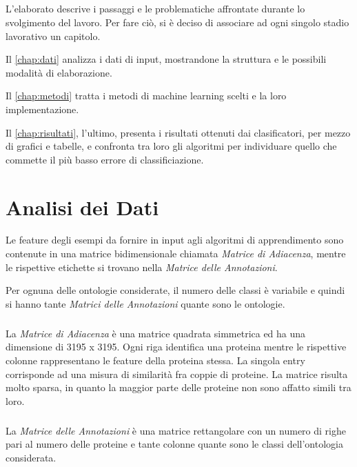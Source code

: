 \documentclass[12pt,a4paper,oneside,hidelinks]{report}
\begin{document}
\paragraph*{}
L'elaborato descrive i passaggi e le problematiche affrontate durante lo svolgimento del lavoro. Per fare ciò, si è deciso di associare ad ogni singolo stadio lavorativo un capitolo. 

Il \autoref{chap:dati} analizza i dati di input, mostrandone la struttura e le possibili modalità di elaborazione.

Il \autoref{chap:metodi} tratta i metodi di machine learning scelti e la loro implementazione. 

Il \autoref{chap:risultati}, l'ultimo, presenta i risultati ottenuti dai clasificatori, per mezzo di grafici e tabelle, e confronta tra loro gli algoritmi per individuare quello che commette il più basso errore di classificiazione.

\chapter{Analisi dei Dati} 
\label{chap:dati}
Le feature degli esempi da fornire in input agli algoritmi di apprendimento sono contenute in una matrice bidimensionale chiamata \textit{Matrice di Adiacenza}, mentre le rispettive etichette si trovano nella \textit{Matrice delle Annotazioni}.

Per ognuna delle ontologie considerate, il numero delle classi è variabile e quindi si hanno tante \textit{Matrici delle Annotazioni} quante sono le ontologie.

\paragraph*{}
La \textit{Matrice di Adiacenza} è una matrice quadrata simmetrica ed ha una dimensione di 3195 x 3195. Ogni riga identifica una proteina mentre le rispettive colonne rappresentano le feature della proteina stessa. La singola entry corrisponde ad una misura di similarità fra coppie di proteine. La matrice risulta molto sparsa, in quanto la maggior parte delle proteine non sono affatto simili tra loro.

\paragraph*{}
La \textit{Matrice delle Annotazioni} è una matrice rettangolare con un numero di righe pari al numero delle proteine e tante colonne quante sono le classi dell'ontologia considerata.
\end{document}
